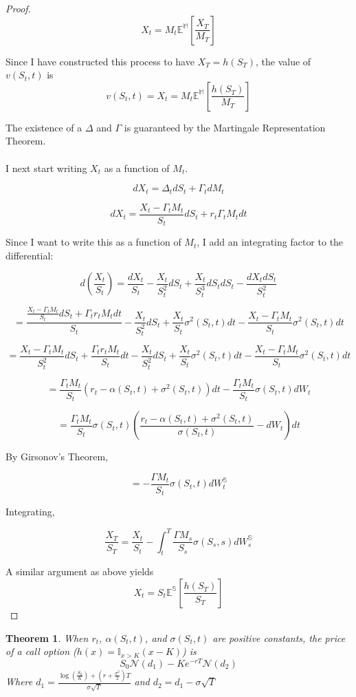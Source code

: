 \documentclass{article}
\newtheorem{theorem}{Theorem}
\begin{document}
\begin{proof}
	\[X_t=M_t \mathbb{E^M}\left[\frac{ X_T}{M_T}\right]\]
	
	Since I have constructed this process to have \(X_T=h(S_T)\), the value of \(v(S_t, t)\) is 
	\[v(S_t, t)=X_t=M_t \mathbb{E^M}\left[\frac{ h(S_T)}{M_T}\right]\]
	
	The existence of a \(\Delta\) and \(\Gamma\) is guaranteed by the Martingale Representation Theorem.
	\\
	\\
	
	I next start writing \(X_t\) as a function of \(M_t\).
	
	
	\[dX_t=\Delta_t dS_t+\Gamma_t dM_t \]
	
	\[dX_t= \frac{X_t-\Gamma_t M_t}{S_t} dS_t +r_t \Gamma_t M_t dt \]
	
	
	Since I want to write this as a function of \(M_t\), I add an integrating factor to the differential:
	
	\[ d\left(\frac{X_t}{S_t}\right)=  \frac{dX_t}{S_t} -\frac{X_t}{S^2_t} dS_t + \frac{X_t}{S^3_t} dS_t dS_t -\frac{dX_t dS_t}{S^2_t} \]
	
	\[= \frac{\frac{X_t-\Gamma_t M_t}{S_t} dS_t +\Gamma_t r_t M_t dt}{S_t} - \frac{X_t}{S^2_t} dS_t + \frac{X_t}{S_t} \sigma^2(S_t, t) dt -\frac{X_t-\Gamma_t M_t}{S_t} \sigma^2(S_t, t) dt  \]
	
	\[= \frac{X_t-\Gamma_t M_t}{S^2_t} dS_t +\frac{\Gamma_t r_t M_t}{S_t} dt- \frac{X_t}{S^2_t} dS_t + \frac{X_t}{S_t} \sigma^2(S_t, t) dt -\frac{X_t-\Gamma_t M_t}{S_t} \sigma^2(S_t, t) dt  \]
	
	\[= \frac{\Gamma_t M_t}{S_t} \left( r_t-\alpha(S_t, t)+\sigma^2(S_t, t)\right) dt - \frac{\Gamma_t M_t}{S_t} \sigma(S_t, t) dW_t \]
	
	\[ = \frac{\Gamma_t M_t}{S_t} \sigma(S_t, t) \left(  \frac{r_t-\alpha(S_t, t) +\sigma^2(S_t, t)}{\sigma(S_t, t)} - dW_t \right) dt \] 
	
	By Girsonov's Theorem,
	
	\[=-\frac{\Gamma M_t}{S_t}\sigma(S_t, t) dW^\mathbb{S}_t \]
	
	
	Integrating,
	
	\[\frac{X_T}{S_T}=\frac{X_t}{S_t}-\int_t ^ T \frac{\Gamma M_s}{S_s}\sigma(S_s, s) dW^\mathbb{S}_s\]
	
	A similar argument as above yields
	\[X_t=S_t \mathbb{E^S}\left[\frac{h(S_T)}{S_T} \right] \]
	
\end{proof}

\begin{theorem}\label{BS}
	When \(r_t\), \(\alpha(S_t, t)\), and \(\sigma(S_t, t)\) are positive constants, the price of a call option (\(h(x)=\mathbb{I}_{x>K}(x-K)\)) is 
	\[S_0 \mathcal{N}(d_1)-K e^{-rT} \mathcal{N}(d_2)\]
	Where \(d_1=\frac{\log\left(\frac{S_0}{K}\right)+\left(r+\frac{\sigma^2}{2}\right) T}{\sigma \sqrt{T}} \) and \(d_2=d_1-\sigma \sqrt{T}\)
\end{theorem}
\end{document}
